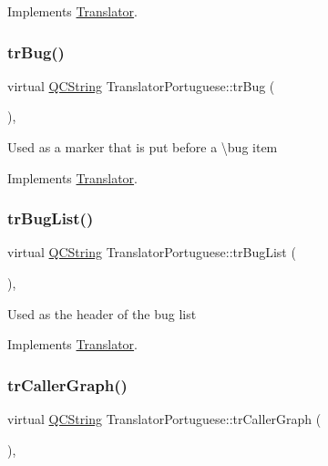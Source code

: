 Implements \mbox{\hyperlink{class_translator}{Translator}}.

\mbox{\label{class_translator_portuguese_a303704a1806264d8e02689da67dec89b}} 
\subsubsection{\texorpdfstring{trBug()}{trBug()}}
{\footnotesize\ttfamily virtual \mbox{\hyperlink{class_q_c_string}{Q\+C\+String}} Translator\+Portuguese\+::tr\+Bug (\begin{DoxyParamCaption}{ }\end{DoxyParamCaption})\hspace{0.3cm}{\ttfamily [inline]}, {\ttfamily [virtual]}}

Used as a marker that is put before a \textbackslash{}bug item 

Implements \mbox{\hyperlink{class_translator}{Translator}}.

\mbox{\label{class_translator_portuguese_adf2619e230b5036a337fb1e839224267}} 
\subsubsection{\texorpdfstring{trBugList()}{trBugList()}}
{\footnotesize\ttfamily virtual \mbox{\hyperlink{class_q_c_string}{Q\+C\+String}} Translator\+Portuguese\+::tr\+Bug\+List (\begin{DoxyParamCaption}{ }\end{DoxyParamCaption})\hspace{0.3cm}{\ttfamily [inline]}, {\ttfamily [virtual]}}

Used as the header of the bug list 

Implements \mbox{\hyperlink{class_translator}{Translator}}.

\mbox{\label{class_translator_portuguese_afb7c39aea2eecd206678561da247d9c8}} 
\subsubsection{\texorpdfstring{trCallerGraph()}{trCallerGraph()}}
{\footnotesize\ttfamily virtual \mbox{\hyperlink{class_q_c_string}{Q\+C\+String}} Translator\+Portuguese\+::tr\+Caller\+Graph (\begin{DoxyParamCaption}{ }\end{DoxyParamCaption})\hspace{0.3cm}{\ttfamily [inline]}, {\ttfamily [virtual]}}

